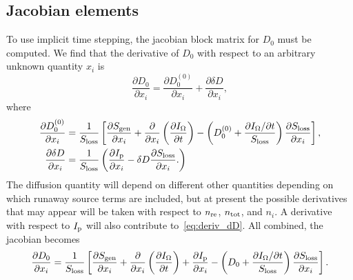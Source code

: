 \documentclass{notes}
\begin{document}
	\subsection{Jacobian elements}
	To use implicit time stepping, the jacobian block matrix for $D_0$ must be
	computed. We find that the derivative of $D_0$ with respect to an arbitrary
	unknown quantity $x_i$ is
	\begin{equation}
		\frac{\partial D_0}{\partial x_i} =
			\frac{\partial D_0^{(0)}}{\partial x_i} +
			\frac{\partial \delta D}{\partial x_i},
	\end{equation}
	where
	\begin{align}
		\frac{\partial D_0^{(0)}}{\partial x_i} &=
			\frac{1}{S_{\rm loss}}\left[
				\frac{\partial S_{\rm gen}}{\partial x_i} +
				\frac{\partial}{\partial x_i}\left(
					\frac{\partial I_\Omega}{\partial t}
				\right) -
				\left(
					D_0^{(0)} +
					\frac{\partial I_\Omega/\partial t}{S_{\rm loss}}
				\right)
				\frac{\partial S_{\rm loss}}{\partial x_i}
			\right],\\
		\frac{\partial\delta D}{\partial x_i} &=
			\frac{1}{S_{\rm loss}}\left(
				\frac{\partial I_{\rm p}}{\partial x_i}
				- \delta D
				\frac{\partial S_{\rm loss}}{\partial x_i}.
			\right)
		\label{eq:deriv_dD}
	\end{align}
	The diffusion quantity will depend on different other quantities depending
	on which runaway source terms are included, but at present the possible
	derivatives that may appear will be taken with respect to $n_{\rm re}$,
	$n_{\rm tot}$, and $n_i$. A derivative with respect to $I_{\rm p}$ will
	also contribute to~\eqref{eq:deriv_dD}. All combined, the jacobian becomes
	\begin{equation}
		\frac{\partial D_0}{\partial x_i} =
			\frac{1}{S_{\rm loss}}\left[
				\frac{\partial S_{\rm gen}}{\partial x_i} +
				\frac{\partial}{\partial x_i}\left(
					\frac{\partial I_\Omega}{\partial t}
				\right) +
				\frac{\partial I_{\rm p}}{\partial x_i} -
				\left(
					D_0 +
					\frac{\partial I_\Omega/\partial t}{S_{\rm loss}}
				\right) \frac{\partial S_{\rm loss}}{\partial x_i}
			\right].
	\end{equation}
\end{document}

